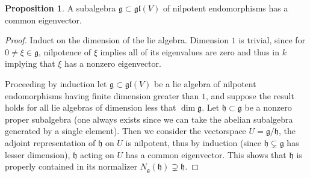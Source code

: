 \documentclass[10.5pt]{article}
\theoremstyle{definition}
\newtheorem{proposition}{Proposition}
\numberwithin{example}{subsection}
\numberwithin{pb}{subsection}
\begin{document}
     \begin{proposition}\label{engelstheoremlemma}
            A subalgebra \(\mathfrak{g} \subset \mathfrak{gl}(V)\) of nilpotent endomorphisms has a common eigenvector.
            \begin{proof}
                Induct on the dimension of the lie algebra. Dimension \(1\) is trivial, since for \(0 \neq \xi \in \mathfrak{g}\), nilpotence of \(\xi\) implies all of its eigenvalues are zero and thus in \(k\) implying that \(\xi\) has a nonzero eigenvector.

                Proceeding by induction let \(\mathfrak{g} \subset \mathfrak{gl}(V)\) be a lie algebra of nilpotent endomorphisms having finite dimension greater than \(1\), and suppose the result holds for all lie algebras of dimension less that \(\dim \mathfrak{g}\). Let \(\mathfrak{h} \subset \mathfrak{g}\) be a nonzero proper subalgebra (one always exists since we can take the abelian subalgebra generated by a single element). Then we consider the vectorspace \(U = \mathfrak{g}/\mathfrak{h}\), the adjoint representation of \(\mathfrak{h}\) on \(U\) is nilpotent, thus by induction (since \(\mathfrak{h} \subsetneq \mathfrak{g}\) has lesser dimension), \(\mathfrak{h}\) acting on \(U\) has a common eigenvector. This shows that \(\mathfrak{h}\) is properly contained in its normalizer \(N_\mathfrak{g}(\mathfrak{h}) \supsetneq \mathfrak{h}\).


\end{proof}
\end{proposition}
\end{document}

